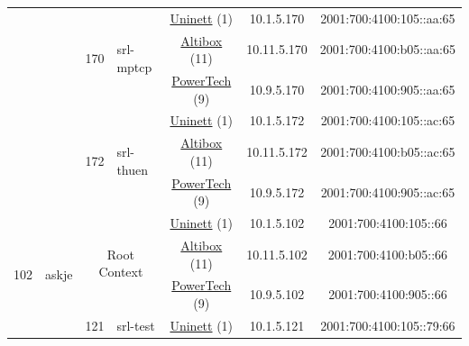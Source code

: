 \begin{small}
\begin{center}
\begin{longtable}{|c|c|c|c|c|c|c|c|}
  &  & \multirow{3}{*}{\tiny{170}} & \multicolumn{1}{|l|}{\multirow{3}{*}{\tiny{srl-mptcp}}} & \multicolumn{2}{|c|}{\tiny{\href{https://www.uninett.no}{Uninett} (1)}} & \tiny{10.1.5.170} & \tiny{2001:700:4100:105::aa:65} \\* \cline{5-5}\cline{6-6}\cline{7-7}\cline{8-8}
  &  &  &  & \multicolumn{2}{|c|}{\tiny{\href{https://www.altibox.no}{Altibox} (11)}} & \tiny{10.11.5.170} & \tiny{2001:700:4100:b05::aa:65} \\* \cline{5-5}\cline{6-6}\cline{7-7}\cline{8-8}
  &  &  &  & \multicolumn{2}{|c|}{\tiny{\href{http://www.powertech.no}{PowerTech} (9)}} & \tiny{10.9.5.170} & \tiny{2001:700:4100:905::aa:65} \\* \cline{3-3}\cline{4-4}\cline{5-5}\cline{6-6}\cline{7-7}\cline{8-8}
  &  & \multirow{3}{*}{\tiny{172}} & \multicolumn{1}{|l|}{\multirow{3}{*}{\tiny{srl-thuen}}} & \multicolumn{2}{|c|}{\tiny{\href{https://www.uninett.no}{Uninett} (1)}} & \tiny{10.1.5.172} & \tiny{2001:700:4100:105::ac:65} \\* \cline{5-5}\cline{6-6}\cline{7-7}\cline{8-8}
  &  &  &  & \multicolumn{2}{|c|}{\tiny{\href{https://www.altibox.no}{Altibox} (11)}} & \tiny{10.11.5.172} & \tiny{2001:700:4100:b05::ac:65} \\* \cline{5-5}\cline{6-6}\cline{7-7}\cline{8-8}
  &  &  &  & \multicolumn{2}{|c|}{\tiny{\href{http://www.powertech.no}{PowerTech} (9)}} & \tiny{10.9.5.172} & \tiny{2001:700:4100:905::ac:65} \\ \hline
 \multirow{30}{*}{\tiny{102}} & \multicolumn{1}{|l|}{\multirow{30}{*}{\tiny{askje}}} & \multicolumn{2}{|c|}{\multirow{3}{*}{\tiny{Root Context}}} & \multicolumn{2}{|c|}{\tiny{\href{https://www.uninett.no}{Uninett} (1)}} & \tiny{10.1.5.102} & \tiny{2001:700:4100:105::66} \\* \cline{5-5}\cline{6-6}\cline{7-7}\cline{8-8}
  &  & \multicolumn{2}{|c|}{} & \multicolumn{2}{|c|}{\tiny{\href{https://www.altibox.no}{Altibox} (11)}} & \tiny{10.11.5.102} & \tiny{2001:700:4100:b05::66} \\* \cline{5-5}\cline{6-6}\cline{7-7}\cline{8-8}
  &  & \multicolumn{2}{|c|}{} & \multicolumn{2}{|c|}{\tiny{\href{http://www.powertech.no}{PowerTech} (9)}} & \tiny{10.9.5.102} & \tiny{2001:700:4100:905::66} \\* \cline{3-3}\cline{4-4}\cline{5-5}\cline{6-6}\cline{7-7}\cline{8-8}
  &  & \multirow{3}{*}{\tiny{121}} & \multicolumn{1}{|l|}{\multirow{3}{*}{\tiny{srl-test}}} & \multicolumn{2}{|c|}{\tiny{\href{https://www.uninett.no}{Uninett} (1)}} & \tiny{10.1.5.121} & \tiny{2001:700:4100:105::79:66} \\* \cline{5-5}\cline{6-6}\cline{7-7}\cline{8-8}

\end{longtable}
\end{center}
\end{small}
